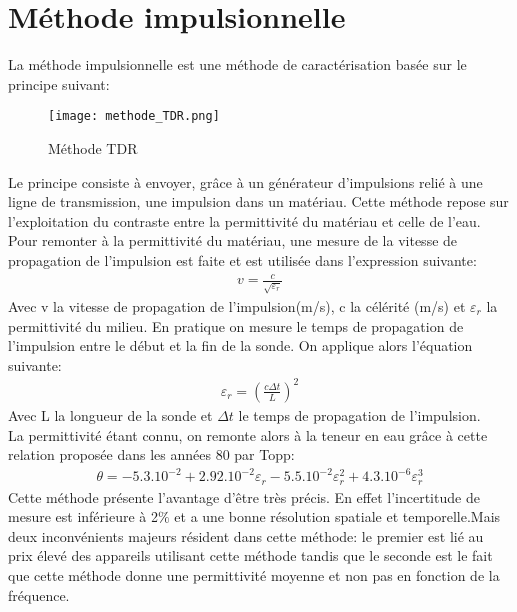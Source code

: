 \section{Méthode impulsionnelle}
La méthode impulsionnelle\cite{ref7} est une méthode de caractérisation basée sur le principe suivant:\\
\begin{figure}[h!]
\centering
\texttt{[image: methode\_TDR.png]}
\caption{Méthode TDR\cite{ref7}}
\end{figure}
Le principe consiste à envoyer, grâce à un générateur d'impulsions relié à une ligne de transmission, une impulsion dans un matériau.
Cette méthode repose sur l'exploitation du contraste entre la permittivité du matériau et celle de l'eau. Pour remonter à la permittivité du matériau, une mesure de la vitesse de propagation de l'impulsion est faite et est utilisée dans l'expression suivante:\\
\begin{align*}
v=\frac{c}{\sqrt{\varepsilon_r}}
\end{align*}
Avec v la vitesse de propagation de l'impulsion(m/s), c la célérité (m/s) et $\varepsilon_r$ la permittivité du milieu.
En pratique on mesure le temps de propagation de l'impulsion entre le début et la fin de la sonde. On applique alors l'équation suivante:\\
\begin{align*}
\varepsilon_r=(\frac{c\Delta t}{L})^2
\end{align*}
Avec L la longueur de la sonde et $\Delta t$ le temps de propagation de l'impulsion.\\
La permittivité étant connu, on remonte alors à la teneur en eau grâce à cette relation proposée dans les années 80 par Topp:\\
\begin{align*}
\theta=-5.3.10^{-2}+2.92.10^{-2}\varepsilon_r-5.5.10^{-2}\varepsilon_r^2+4.3.10^{-6}\varepsilon_r^3
\end{align*}
Cette méthode présente l'avantage d'être très précis. En effet l'incertitude de mesure est inférieure à 2$\%$ et a une bonne résolution spatiale et temporelle.Mais deux inconvénients majeurs résident dans cette méthode: le premier est lié au prix élevé des appareils utilisant cette méthode tandis que le seconde est le fait que cette méthode donne une permittivité moyenne et non pas en fonction de la fréquence.
